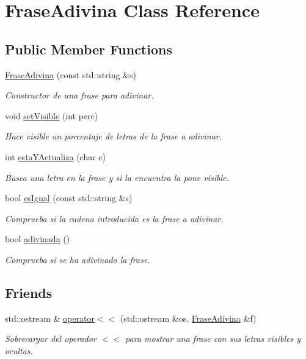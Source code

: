 \hypertarget{class_frase_adivina}{}\section{Frase\+Adivina Class Reference}
\label{class_frase_adivina}
\subsection*{Public Member Functions}
\begin{DoxyCompactItemize}
\item 
\hyperlink{class_frase_adivina_ae8c205f4adc1058a2fee416550808884}{Frase\+Adivina} (const std\+::string \&s)
\begin{DoxyCompactList}\small\item\em Constructor de una frase para adivinar. \end{DoxyCompactList}\item 
void \hyperlink{class_frase_adivina_a23aa7d6880ad9223198fb2aab163bbd6}{set\+Visible} (int perc)
\begin{DoxyCompactList}\small\item\em Hace visible un porcentaje de letras de la frase a adivinar. \end{DoxyCompactList}\item 
int \hyperlink{class_frase_adivina_a2f1fce08585d1e26192e48d6fea965e7}{esta\+Y\+Actualiza} (char c)
\begin{DoxyCompactList}\small\item\em Busca una letra en la frase y si la encuentra la pone visible. \end{DoxyCompactList}\item 
bool \hyperlink{class_frase_adivina_a63b6feb0e8ea8b3783ac9f607c9d98af}{es\+Igual} (const std\+::string \&s)
\begin{DoxyCompactList}\small\item\em Comprueba si la cadena introducida es la frase a adivinar. \end{DoxyCompactList}\item 
bool \hyperlink{class_frase_adivina_ac1738127e0d5b240152c67ba3aadf763}{adivinada} ()
\begin{DoxyCompactList}\small\item\em Comprueba si se ha adivinado la frase. \end{DoxyCompactList}\end{DoxyCompactItemize}
\subsection*{Friends}
\begin{DoxyCompactItemize}
\item 
std\+::ostream \& \hyperlink{class_frase_adivina_abbefd724cae153a9b51dcdefb5ffa29b}{operator$<$$<$} (std\+::ostream \&os, \hyperlink{class_frase_adivina}{Frase\+Adivina} \&f)
\begin{DoxyCompactList}\small\item\em Sobrecargar del operador $<$$<$ para mostrar una frase con sus letras visibles y ocultas. \end{DoxyCompactList}\end{DoxyCompactItemize}


